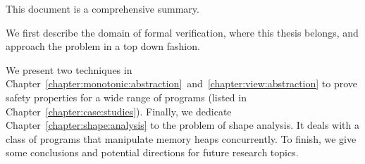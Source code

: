 This document is a comprehensive summary.

\bigskip%
%
We first describe the domain of formal verification, where this thesis
belongs, and approach the problem in a top down fashion.

%
We present two techniques in
Chapter~\ref{chapter:monotonic:abstraction}~and~\ref{chapter:view:abstraction}
to prove safety properties for a wide range of programs (listed in
Chapter~\ref{chapter:case:studies}).
%
Finally, we dedicate Chapter~\ref{chapter:shape:analysis} to the
problem of shape analysis. It deals with a class of programs that
manipulate memory heaps concurrently.
%
To finish, we give some conclusions and potential directions for
future research topics.
